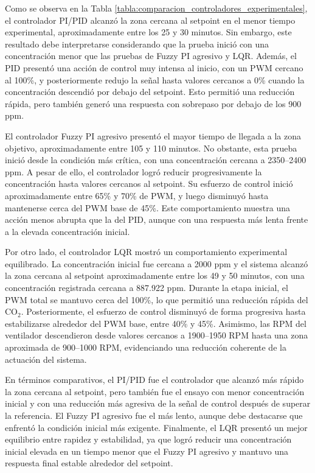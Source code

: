 Como se observa en la Tabla \ref{tabla:comparacion_controladores_experimentales}, el controlador PI/PID alcanzó la zona cercana al setpoint en el menor tiempo experimental, aproximadamente entre los 25 y 30 minutos. Sin embargo, este resultado debe interpretarse considerando que la prueba inició con una concentración menor que las pruebas de Fuzzy PI agresivo y LQR. Además, el PID presentó una acción de control muy intensa al inicio, con un PWM cercano al 100\%, y posteriormente redujo la señal hasta valores cercanos a 0\% cuando la concentración descendió por debajo del setpoint. Esto permitió una reducción rápida, pero también generó una respuesta con sobrepaso por debajo de los 900 ppm.

El controlador Fuzzy PI agresivo presentó el mayor tiempo de llegada a la zona objetivo, aproximadamente entre 105 y 110 minutos. No obstante, esta prueba inició desde la condición más crítica, con una concentración cercana a 2350--2400 ppm. A pesar de ello, el controlador logró reducir progresivamente la concentración hasta valores cercanos al setpoint. Su esfuerzo de control inició aproximadamente entre 65\% y 70\% de PWM, y luego disminuyó hasta mantenerse cerca del PWM base de 45\%. Este comportamiento muestra una acción menos abrupta que la del PID, aunque con una respuesta más lenta frente a la elevada concentración inicial.

Por otro lado, el controlador LQR mostró un comportamiento experimental equilibrado. La concentración inicial fue cercana a 2000 ppm y el sistema alcanzó la zona cercana al setpoint aproximadamente entre los 49 y 50 minutos, con una concentración registrada cercana a 887.922 ppm. Durante la etapa inicial, el PWM total se mantuvo cerca del 100\%, lo que permitió una reducción rápida del CO\(_2\). Posteriormente, el esfuerzo de control disminuyó de forma progresiva hasta estabilizarse alrededor del PWM base, entre 40\% y 45\%. Asimismo, las RPM del ventilador descendieron desde valores cercanos a 1900--1950 RPM hasta una zona aproximada de 900--1000 RPM, evidenciando una reducción coherente de la actuación del sistema.

En términos comparativos, el PI/PID fue el controlador que alcanzó más rápido la zona cercana al setpoint, pero también fue el ensayo con menor concentración inicial y con una reducción más agresiva de la señal de control después de superar la referencia. El Fuzzy PI agresivo fue el más lento, aunque debe destacarse que enfrentó la condición inicial más exigente. Finalmente, el LQR presentó un mejor equilibrio entre rapidez y estabilidad, ya que logró reducir una concentración inicial elevada en un tiempo menor que el Fuzzy PI agresivo y mantuvo una respuesta final estable alrededor del setpoint.

